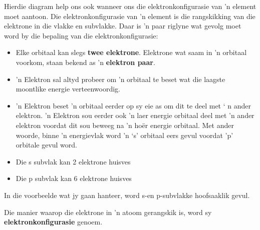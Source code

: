 \label{m38741*eip-752}Hierdie diagram help ons ook wanneer ons die elektronkonfigurasie van  'n element moet aantoon. Die elektronkonfigurasie van  'n element is die rangskikking van die elektrone in die vlakke en subvlakke. Daar is  'n paar riglyne wat gevolg moet word by die bepaling van die elektronkonfigurasie:
\par \label{m38741*id259303}\begin{itemize}[noitemsep]
            \label{m38741*uid93}\item Elke orbitaal kan slegs \textbf{twee elektrone}. Elektrone wat saam in  'n orbitaal voorkom, staan bekend as   'n \textbf{elektron paar}.
\label{m38741*uid94}\item  'n Elektron sal altyd probeer om  'n orbitaal te beset wat die laagste moontlike energie verteenwoordig.
\label{m38741*uid95}\item  'n Elektron beset  'n orbitaal eerder op sy eie as om dit te deel met ‘ n ander elektron.  'n Elektron sou eerder ook  'n laer energie orbitaal deel met  'n ander elektron voordat dit sou beweeg na  'n hoër energie orbitaal. Met ander woorde, binne  'n energievlak word   'n ‘s' orbitaal eers gevul voordat 'p' orbitale gevul word.
\label{m38741*uid83}\item Die s subvlak kan 2 elektrone huisves
\label{m38741*uid84}\item Die p subvlak kan 6 elektrone huisves
\end{itemize}
        \label{m38741*eip-15}In die voorbeelde wat jy gaan hanteer, word s-en p-subvlakke hoofsaaklik gevul.
\par 
        \label{m38741*id259599}Die manier waarop die elektrone in  'n atoom gerangskik is, word sy \textbf{elektronkonfigurasie} genoem.\par 

